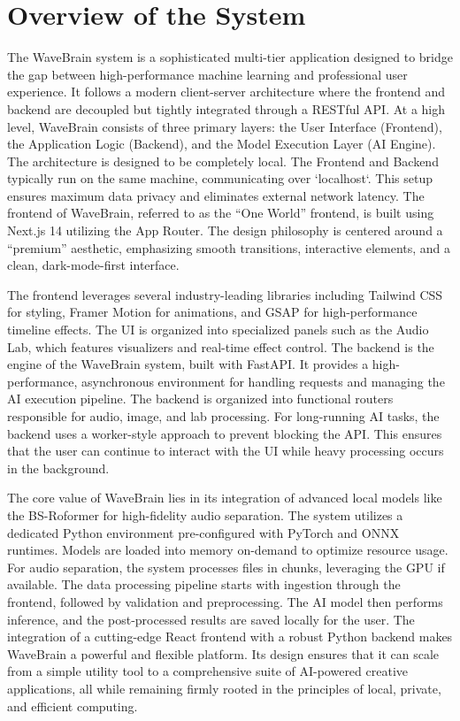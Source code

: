 \documentclass[12pt,a4paper]{article}
\begin{document}
\section{Overview of the System}
The WaveBrain system is a sophisticated multi-tier application designed to bridge the gap between high-performance machine learning and professional user experience. It follows a modern client-server architecture where the frontend and backend are decoupled but tightly integrated through a RESTful API. At a high level, WaveBrain consists of three primary layers: the User Interface (Frontend), the Application Logic (Backend), and the Model Execution Layer (AI Engine). The architecture is designed to be completely local. The Frontend and Backend typically run on the same machine, communicating over `localhost`. This setup ensures maximum data privacy and eliminates external network latency. The frontend of WaveBrain, referred to as the ``One World'' frontend, is built using Next.js 14 utilizing the App Router. The design philosophy is centered around a ``premium'' aesthetic, emphasizing smooth transitions, interactive elements, and a clean, dark-mode-first interface.

The frontend leverages several industry-leading libraries including Tailwind CSS for styling, Framer Motion for animations, and GSAP for high-performance timeline effects. The UI is organized into specialized panels such as the Audio Lab, which features visualizers and real-time effect control. The backend is the engine of the WaveBrain system, built with FastAPI. It provides a high-performance, asynchronous environment for handling requests and managing the AI execution pipeline. The backend is organized into functional routers responsible for audio, image, and lab processing. For long-running AI tasks, the backend uses a worker-style approach to prevent blocking the API. This ensures that the user can continue to interact with the UI while heavy processing occurs in the background.

The core value of WaveBrain lies in its integration of advanced local models like the BS-Roformer for high-fidelity audio separation. The system utilizes a dedicated Python environment pre-configured with PyTorch and ONNX runtimes. Models are loaded into memory on-demand to optimize resource usage. For audio separation, the system processes files in chunks, leveraging the GPU if available. The data processing pipeline starts with ingestion through the frontend, followed by validation and preprocessing. The AI model then performs inference, and the post-processed results are saved locally for the user. The integration of a cutting-edge React frontend with a robust Python backend makes WaveBrain a powerful and flexible platform. Its design ensures that it can scale from a simple utility tool to a comprehensive suite of AI-powered creative applications, all while remaining firmly rooted in the principles of local, private, and efficient computing.
\end{document}
